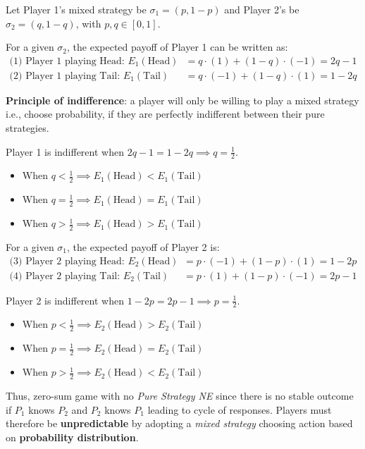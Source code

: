 \documentclass[../Main.tex]{subfiles}
\begin{document}
Let Player 1's mixed strategy be $\sigma_1 = (p, 1-p)$ and Player 2's be $\sigma_2 = (q, 1-q)$, with $p, q \in [0,1]$.

For a given $\sigma_2$, the expected payoff of Player 1 can be written as:
\begin{align*}
    \text{(1) Player 1 playing Head: } E_1(\text{Head}) &= q \cdot (1) + (1-q) \cdot (-1) = 2q - 1 \\
    \text{(2) Player 1 playing Tail: }  E_1(\text{Tail})  &= q \cdot (-1) + (1-q) \cdot (1) = 1 - 2q
\end{align*}

\textbf{Principle of indifference}: a player will only be willing to play a mixed strategy i.e., choose probability, if they are perfectly indifferent between their pure strategies. 

Player 1 is indifferent when $2q - 1 = 1 - 2q \implies q = \frac{1}{2}$.
\begin{itemize}
    \item When $q < \frac{1}{2} \implies E_1(\text{Head}) < E_1(\text{Tail})$
    \item When $q = \frac{1}{2} \implies E_1(\text{Head}) = E_1(\text{Tail})$
    \item When $q > \frac{1}{2} \implies E_1(\text{Head}) > E_1(\text{Tail})$
\end{itemize}

For a given $\sigma_1$, the expected payoff of Player 2 is:
\begin{align*}
    \text{(3) Player 2 playing Head: } E_2(\text{Head}) &= p \cdot (-1) + (1-p) \cdot (1) = 1 - 2p \\
    \text{(4) Player 2 playing Tail: }  E_2(\text{Tail})  &= p \cdot (1) + (1-p) \cdot (-1) = 2p - 1
\end{align*}

Player 2 is indifferent when $1 - 2p = 2p - 1 \implies p = \frac{1}{2}$.
\begin{itemize}
    \item When $p < \frac{1}{2} \implies E_2(\text{Head}) > E_2(\text{Tail})$
    \item When $p = \frac{1}{2} \implies E_2(\text{Head}) = E_2(\text{Tail})$
    \item When $p > \frac{1}{2} \implies E_2(\text{Head}) < E_2(\text{Tail})$
\end{itemize}

Thus, zero-sum game with no \textit{Pure Strategy NE} since there is no stable outcome if $P_1$ knows $P_2$ and $P_2$ knows $P_1$ leading to cycle of responses. Players must therefore be \textbf{unpredictable} by adopting a \textit{mixed strategy} choosing action based on \textbf{probability distribution}.
\end{document}
